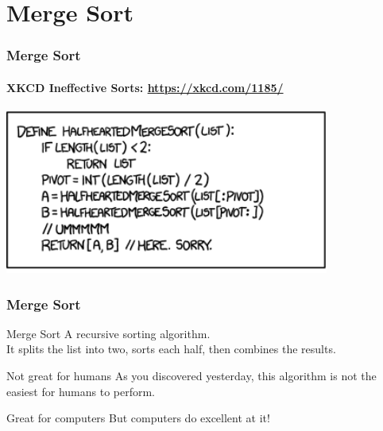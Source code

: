 \section{Merge Sort}
\label{sec:merge_sort}


\begin{frame}
	\frametitle{Merge Sort}
	\framesubtitle{XKCD Ineffective Sorts: \url{https://xkcd.com/1185/}}
	\begin{center}
		\includegraphics[width=0.8\textwidth]{figures/mergesort.png}\\
	\end{center}
\end{frame}

\begin{frame}
	\frametitle{Merge Sort}
	\begin{block}{Merge Sort}
		A recursive sorting algorithm.\\
		\pause
		It splits the list into two, sorts each half, then combines the results.
	\end{block}	
	\pause
	\begin{alertblock}{Not great for humans}
		As you discovered yesterday, this algorithm is not the easiest for humans to perform.
	\end{alertblock}	
	\pause
	\begin{exampleblock}{Great for computers}
		But computers do excellent at it!
	\end{exampleblock}	
\end{frame}

